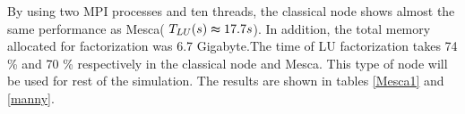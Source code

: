 By using two MPI processes and ten threads, the classical node shows almost the same performance as Mesca(
 $T_{LU}(s)\thickapprox 17.7 s$). In addition, the total memory allocated for factorization was  6.7 Gigabyte.The time of LU factorization takes 74 \% and 70 \% respectively in the classical node and Mesca. This type of node will be used for rest of the simulation. The results are shown in tables \ref{Mesca1} and \ref{manny}. \newline
%

